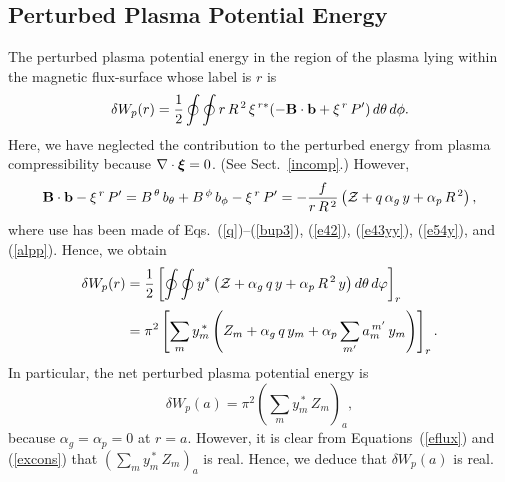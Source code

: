 \documentclass[12pt,prb,aps]{revtex4-1}
\newcommand {\bxi}{\mbox{\boldmath$\xi$}}
\begin{document}
\subsection{Perturbed Plasma Potential Energy}
The perturbed plasma potential energy in the region of the plasma lying within the magnetic flux-surface whose label is $r$ is\,\cite{tj1,gs1}
\begin{equation}
\delta W_p(r) = \frac{1}{2}\oint\oint r\,R^{\,2}\,\xi^{\,r\ast}(-{\bf B}\cdot{\bf b} + \xi^{\,r}\,P')\,d\theta\,d\phi.
\end{equation}
Here, we have neglected the contribution to the perturbed energy from plasma compressibility because $\nabla\cdot\bxi= 0$. (See Sect.~\ref{incomp}.)
However,
\begin{equation}
{\bf B}\cdot{\bf b} -\xi^{\,r}\,P' = B^{\,\theta}\,b_\theta+B^{\,\phi}\,b_\phi - \xi^{\,r}\,P'
= - \frac{f}{r\,R^{\,2}}\left({\cal Z} + q\,\alpha_g\,y + \alpha_p\,R^{\,2}\right),
\end{equation}
where use has been made of Eqs.~(\ref{q})--(\ref{bup3}), (\ref{e42}), (\ref{e43yy}), (\ref{e54y}),  and (\ref{alpp}). Hence,
we obtain
\begin{align}\label{e87j}
\delta W_p(r) &=\frac{1}{2}\left[\oint\oint y^{\ast}\left({\cal Z} + \alpha_g \,q\,y+ \alpha_p\,R^{\,2}\, y\right)d\theta\,d\varphi\right]_r\nonumber\\[0.5ex]
&=\pi^2\left[\sum_{m}y_m^{\,\ast}\left(Z_m + \alpha_g \,q\,y_m+ \alpha_p\sum_{m'}a_m^{\,m'}\, y_m\right)\right]_r.
\end{align}
 In particular,  the net perturbed plasma potential energy is 
 \begin{equation}\label{e7.34yi}
 \delta W_p(a) =  \pi^2\left(\sum_{m}y_m^{\,\ast}\,Z_m \right)_a,
 \end{equation}
 because $\alpha_g=\alpha_p =0$ at $r=a$. However, it is clear from Equations~(\ref{eflux}) and (\ref{excons}) that $(\sum_m y_m^{\,\ast}\,Z_m)_a$ is real. 
 Hence, we deduce that $\delta W_p(a)$ is real. 
 
\end{document}
